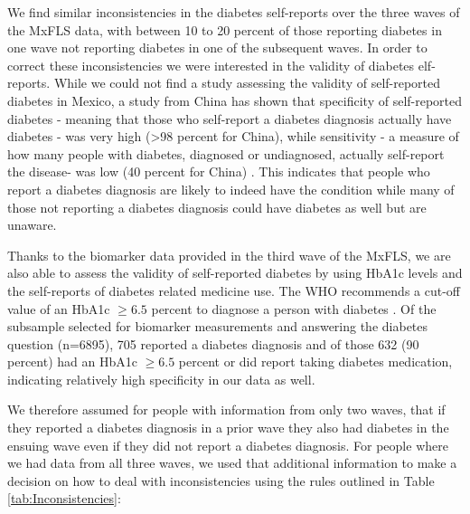\documentclass[12pt,english,british]{article}
\begin{document}
\begin{appendix}
We find similar inconsistencies in the diabetes self-reports over
the three waves of the \ac{MxFLS} data, with between 10 to 20 percent
of those reporting diabetes in one wave not reporting diabetes in
one of the subsequent waves. In order to correct these inconsistencies we were interested in the validity of diabetes elf-reports. While we could not find a study assessing
the validity of self-reported diabetes in Mexico, a study from China
has shown that specificity of self-reported diabetes - meaning that
those who self-report a diabetes diagnosis actually have diabetes
- was very high (>98 percent for China), while sensitivity - a measure
of how many people with diabetes, diagnosed or undiagnosed, actually
self-report the disease- was low (40 percent for China) \citep{Yuan2015}.
This indicates that people who report a diabetes diagnosis are likely
to indeed have the condition while many of those not reporting
a diabetes diagnosis could have diabetes as well but are unaware.

Thanks to the biomarker data provided in the third wave of the \ac{MxFLS},
we are also able to assess the validity of self-reported diabetes
by using \ac{HbA1c} levels and the self-reports of diabetes
related medicine use. The \ac{WHO}
recommends a cut-off value of an \ac{HbA1c} $\geq6.5$ percent
to diagnose a person with diabetes \citep{WorldHealthOrganization2011}.
Of the subsample selected for biomarker measurements and answering
the diabetes question (n=6895), 705 reported a diabetes diagnosis
and of those 632 (90 percent) had an \ac{HbA1c} $\geq6.5$ percent
or did report taking diabetes medication, indicating relatively high specificity in our data as well.

We therefore assumed for people with information from only two waves, that if
they reported a diabetes diagnosis in a prior wave they also had diabetes
in the ensuing wave even if they did not report a diabetes diagnosis.
For people where we had data from all three waves, we used that
additional information to make a decision on how to deal with inconsistencies
using the rules outlined in Table \ref{tab:Inconsistencies}:


\end{appendix}
\end{document}
